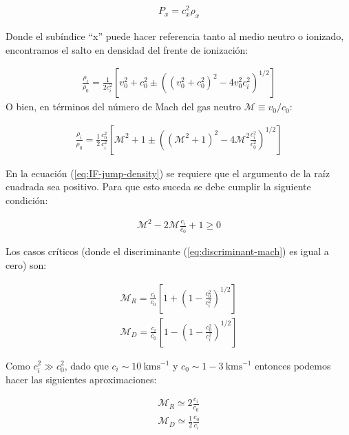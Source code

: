 \begin{align}
  P_x = c^2_x\rho_x
\end{align}

Donde el subíndice ``x'' puede hacer referencia tanto al medio neutro o ionizado, encontramos el salto en densidad del frente de ionización:

\begin{align}
  \frac{\rho_i}{\rho_0} = \frac{1}{2c^2_i}\left[v^2_0 + c^2_0 \pm \left(\left(v^2_0 + c^2_0\right)^2 -4v^2_0c^2_i\right)^{1/2}\right]
\end{align}
O bien, en términos del número de Mach del gas neutro $\mathcal{M}\equiv v_0/c_0$:

\begin{align}
    \frac{\rho_i}{\rho_0} = \frac{1}{2}\frac{c^2_0}{c^2_i}\left[\mathcal{M}^2 + 1 \pm \left(\left(\mathcal{M}^2 + 1\right)^2 -4\mathcal{M}^2\frac{c^2_i}{c^2_0}\right)^{1/2}\right] \label{eq:IF-jump-density}
\end{align}

En la ecuación (\ref{eq:IF-jump-density}) se requiere que el argumento de la raíz cuadrada sea positivo. Para que esto suceda se debe cumplir la siguiente condición:

\begin{align}
  \mathcal{M}^2 - 2\mathcal{M}\frac{c_i}{c_0} + 1 \geq 0 \label{eq:discriminant-mach}
\end{align}

Los casos críticos (donde el discriminante (\ref{eq:discriminant-mach}) es igual a cero) son:

\begin{align}
  \mathcal{M}_R = \frac{c_i}{c_0}\left[1 + \left(1 - \frac{c^2_0}{c^2_i}\right)^{1/2}\right] \\
  \mathcal{M}_D = \frac{c_i}{c_0}\left[1 - \left(1 - \frac{c^2_0}{c^2_i}\right)^{1/2}\right]
\end{align}

Como $c^2_i \gg c^2_0$, dado que $c_i \sim 10\mathrm{~kms^{-1}}$ y $c_0 \sim 1-3\mathrm{~kms^{-1}}$ entonces podemos hacer las siguientes aproximaciones:

\begin{align}
  \mathcal{M}_R \simeq 2\frac{c_i}{c_0} \\
  \mathcal{M}_D \simeq \frac{1}{2}\frac{c_0}{c_i}
\end{align}

